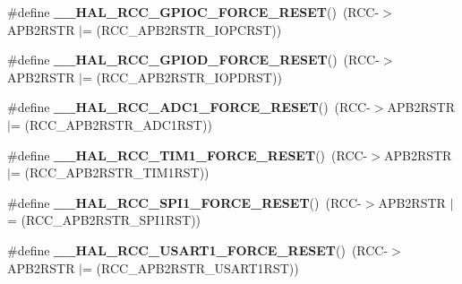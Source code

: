 \begin{DoxyCompactItemize}
\mbox{\label{group___r_c_c___a_p_b2___force___release___reset_ga6e6a20fa8e0d7b3ebfdce26f6b1a1ed0}} 
\#define {\bfseries \+\_\+\+\_\+\+H\+A\+L\+\_\+\+R\+C\+C\+\_\+\+G\+P\+I\+O\+C\+\_\+\+F\+O\+R\+C\+E\+\_\+\+R\+E\+S\+ET}()~(R\+CC-\/$>$A\+P\+B2\+R\+S\+TR $\vert$= (R\+C\+C\+\_\+\+A\+P\+B2\+R\+S\+T\+R\+\_\+\+I\+O\+P\+C\+R\+ST))
\item 
\mbox{\label{group___r_c_c___a_p_b2___force___release___reset_gaf0f7c49787fc94edeea74aa4218aeaf6}} 
\#define {\bfseries \+\_\+\+\_\+\+H\+A\+L\+\_\+\+R\+C\+C\+\_\+\+G\+P\+I\+O\+D\+\_\+\+F\+O\+R\+C\+E\+\_\+\+R\+E\+S\+ET}()~(R\+CC-\/$>$A\+P\+B2\+R\+S\+TR $\vert$= (R\+C\+C\+\_\+\+A\+P\+B2\+R\+S\+T\+R\+\_\+\+I\+O\+P\+D\+R\+ST))
\item 
\mbox{\label{group___r_c_c___a_p_b2___force___release___reset_ga6176fa4f52de6ebf932d99a4d611634d}} 
\#define {\bfseries \+\_\+\+\_\+\+H\+A\+L\+\_\+\+R\+C\+C\+\_\+\+A\+D\+C1\+\_\+\+F\+O\+R\+C\+E\+\_\+\+R\+E\+S\+ET}()~(R\+CC-\/$>$A\+P\+B2\+R\+S\+TR $\vert$= (R\+C\+C\+\_\+\+A\+P\+B2\+R\+S\+T\+R\+\_\+\+A\+D\+C1\+R\+ST))
\item 
\mbox{\label{group___r_c_c___a_p_b2___force___release___reset_gac423d6a52fa42423119844e4a7d68c7b}} 
\#define {\bfseries \+\_\+\+\_\+\+H\+A\+L\+\_\+\+R\+C\+C\+\_\+\+T\+I\+M1\+\_\+\+F\+O\+R\+C\+E\+\_\+\+R\+E\+S\+ET}()~(R\+CC-\/$>$A\+P\+B2\+R\+S\+TR $\vert$= (R\+C\+C\+\_\+\+A\+P\+B2\+R\+S\+T\+R\+\_\+\+T\+I\+M1\+R\+ST))
\item 
\mbox{\label{group___r_c_c___a_p_b2___force___release___reset_ga87e6bc588fa1d5ce3928d2fd2a3156a4}} 
\#define {\bfseries \+\_\+\+\_\+\+H\+A\+L\+\_\+\+R\+C\+C\+\_\+\+S\+P\+I1\+\_\+\+F\+O\+R\+C\+E\+\_\+\+R\+E\+S\+ET}()~(R\+CC-\/$>$A\+P\+B2\+R\+S\+TR $\vert$= (R\+C\+C\+\_\+\+A\+P\+B2\+R\+S\+T\+R\+\_\+\+S\+P\+I1\+R\+ST))
\item 
\mbox{\label{group___r_c_c___a_p_b2___force___release___reset_ga5db01cf30bf3c5c7fc0b42220f4c70ad}} 
\#define {\bfseries \+\_\+\+\_\+\+H\+A\+L\+\_\+\+R\+C\+C\+\_\+\+U\+S\+A\+R\+T1\+\_\+\+F\+O\+R\+C\+E\+\_\+\+R\+E\+S\+ET}()~(R\+CC-\/$>$A\+P\+B2\+R\+S\+TR $\vert$= (R\+C\+C\+\_\+\+A\+P\+B2\+R\+S\+T\+R\+\_\+\+U\+S\+A\+R\+T1\+R\+ST))

\end{DoxyCompactItemize}
